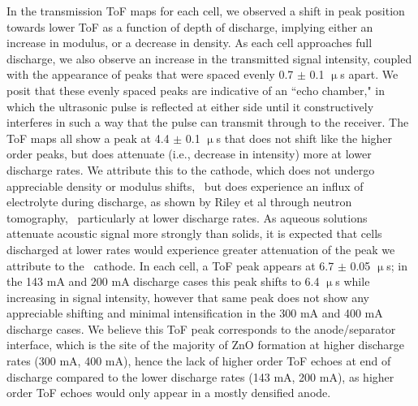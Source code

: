 In the transmission ToF maps for each cell, we observed a shift in peak position towards lower ToF as a function of depth of discharge, implying either an increase in modulus, or a decrease in density. As each cell approaches full discharge, we also observe an increase in the transmitted signal intensity, coupled with the appearance of peaks that were spaced evenly 0.7 $\pm$ 0.1 $\upmu$s apart. We posit that these evenly spaced peaks are indicative of an ``echo chamber," in which the ultrasonic pulse is reflected at either side until it constructively interferes in such a way that the pulse can transmit through to the receiver. The ToF maps all show a peak at 4.4 $\pm$ 0.1 $\upmu$s that does not shift like the higher order peaks, but does attenuate (i.e., decrease in intensity) more at lower discharge rates. We attribute this to the  cathode, which does not undergo appreciable density or modulus shifts,~\cite{Tao2013-vg} but does experience an influx of electrolyte during discharge, as shown by Riley et al through neutron tomography,~\cite{Riley2010-ur} particularly at lower discharge rates. As aqueous solutions attenuate acoustic signal more strongly than solids, it is expected that cells discharged at lower rates would experience greater attenuation of the peak we attribute to the~ cathode. In each cell, a ToF peak appears at 6.7 $\pm$ 0.05 $\upmu$s; in the 143 mA and 200 mA discharge cases this peak shifts to 6.4 $\upmu$s while increasing in signal intensity, however that same peak does not show any appreciable shifting and minimal intensification in the 300 mA and 400 mA discharge cases. We believe this ToF peak corresponds to the anode/separator interface, which is the site of the majority of ZnO formation at higher discharge rates (300 mA, 400 mA), hence the lack of higher order ToF echoes at end of discharge compared to the lower discharge rates (143 mA, 200 mA), as higher order ToF echoes would only appear in a mostly densified anode.

